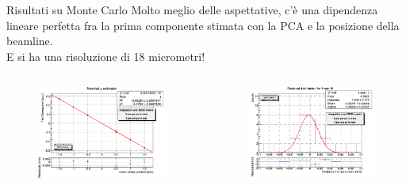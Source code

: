 \documentclass[
10pt,
aspectratio=169,
]{beamer}
\begin{document}
\begin{frame}{Risultati su Monte Carlo}
Molto meglio delle aspettative, c'è una dipendenza lineare perfetta fra la prima componente stimata con la PCA e la posizione della beamline.\\
E si ha una risoluzione di 18 micrometri!
    \begin{columns}
        \begin{figure}
            \centering
            \includegraphics[width=\textwidth]{y_fit_MC.png}
        \end{figure}
        \begin{figure}
            \centering
            \includegraphics[width=\textwidth]{x_res_MC.png}
        \end{figure}
    \end{columns}
\end{frame}
\end{document}
